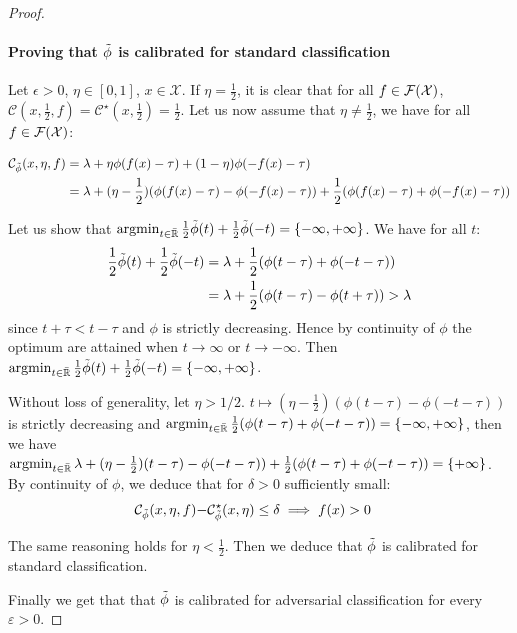 \begin{proof}
    \paragraph{Proving that $\Tilde{\phi}$ is calibrated for standard classification} Let $\epsilon>0$, $\eta\in[0,1]$, $x\in\mathcal{X}$. If $\eta=\frac12$, it is clear that for all $f\in\mathcal{F}(\mathcal{X})$, $\mathcal{C}(x,\frac12,f)= \mathcal{C}^\star(x,\frac12)=\frac12$. Let us now assume that $\eta\neq\frac12$, we have for all $f\in\mathcal{F}(\mathcal{X})$:
    
    \begin{align*}
         \mathcal{C}_{\Tilde{\phi}}(x,\eta,f) &= \lambda + \eta\phi(f(x)-\tau) + (1-\eta)\phi(-f(x)-\tau)\\
         &= \lambda + (\eta-\frac12)\left(\phi(f(x)-\tau)-\phi(-f(x)-\tau)\right)+\frac12 \left(\phi(f(x)-\tau)+\phi(-f(x)-\tau)\right)
    \end{align*}
    
    
    Let us  show that $\operatorname*{argmin}_{t\in\bar{\mathbb{R}}}\frac12\Tilde{\phi}(t)+\frac12 \Tilde{\phi}(-t) = \{-\infty,+\infty\}$. We have for all $t$:
    \begin{align*}
        \frac12\Tilde{\phi}(t)+\frac12\Tilde{\phi}(-t) &= \lambda +\frac12 \left(\phi(t-\tau)+\phi(-t-\tau)\right)\\
        & = \lambda +\frac12 \left(\phi(t-\tau)-\phi(t+\tau)\right)>\lambda
    \end{align*}
    since $t+\tau< t-\tau$ and $\phi$ is strictly decreasing. Hence by continuity of $\phi$ the optimum are attained when $t\to\infty$ or $t\to-\infty$. Then $\operatorname*{argmin}_{t\in\bar{\mathbb{R}}}\frac12\Tilde{\phi}(t)+\frac12 \Tilde{\phi}(-t) = \{-\infty,+\infty\}$.
    
    Without loss of generality, let $\eta>1/2$. $t\mapsto  (\eta-\frac12)\left(\phi(t-\tau)-\phi(-t-\tau)\right)$ is strictly decreasing and $\argminB_{t\in\bar{\RR}}\frac12 \left(\phi(t-\tau)+\phi(-t-\tau)\right) = \{-\infty,+\infty\}$, then we have $ \argminB_{t\in\bar{\RR}} \lambda + (\eta-\frac12)\left(t-\tau)-\phi(-t-\tau)\right)+\frac12 \left(\phi(t-\tau)+\phi(-t-\tau)\right) = \{+\infty\}$. By continuity of $\phi$, we deduce that for $\delta>0$ sufficiently small:
    \begin{align*}
        \mathcal{C}_{\Tilde{\phi}}(x,\eta,f)-&\mathcal{C}^\star_{\Tilde{\phi}}(x,\eta)\leq\delta\implies f(x)>0
    \end{align*}
    
    The same reasoning holds for $\eta<\frac12$. Then we deduce that $\Tilde{\phi}$ is calibrated for standard classification.
    
    \medskip
    
    Finally we get that  that $\Tilde{\phi}$ is calibrated for adversarial classification for every $\varepsilon>0$.
\end{proof}




